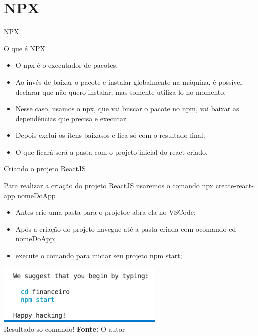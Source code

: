 \documentclass{beamer}
\begin{document}
\section{NPX}
    \begin{frame}[label=lists]{NPX}
    \begin{exampleblock}{O que é NPX}
        	\begin{itemize}
	\item O npx é o executador de pacotes. 
	\item Ao invés de baixar o pacote e instalar globalmente na máquina, é possível declarar que não quero instalar, mas somente utiliza-lo no momento.
	\item Nesse caso, usamos o npx, que vai buscar o pacote no npm, vai baixar as dependências que precisa e executar.
	\item Depois exclui os itens baixasos e fica só com o resultado final;
	\item O que ficará será a pasta com o projeto inicial do react criado.
        	\end{itemize}
      \end{exampleblock}
    \end{frame}
    \begin{frame}[label=lists]{Criando o projeto ReactJS}

         Para realizar a criação do projeto ReactJS usaremos o comando \alert{npx create-react-app nomeDoApp}
         \begin{itemize}
         \item Antes crie uma pasta para o projetoe abra ela no VSCode;
         \item Após a criação do projeto navegue até a pasta criada com ocomando \alert{cd nomeDoApp};
         \item execute o comando para iniciar seu projeto \alert{npm start};
         \end{itemize}
	            \includegraphics[width=80mm]{resources/aula12_2.png}\\
            \tiny{Resultado so comando! \textbf{Fonte:} O autor}
    \end{frame}
\end{document}
